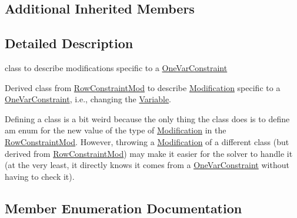 \subsection*{Additional Inherited Members}


\subsection{Detailed Description}
class to describe modifications specific to a \mbox{\hyperlink{class_s_m_spp__di__unipi__it_1_1_one_var_constraint}{One\+Var\+Constraint}} 

Derived class from \mbox{\hyperlink{class_s_m_spp__di__unipi__it_1_1_row_constraint_mod}{Row\+Constraint\+Mod}} to describe \mbox{\hyperlink{class_s_m_spp__di__unipi__it_1_1_modification}{Modification}} specific to a \mbox{\hyperlink{class_s_m_spp__di__unipi__it_1_1_one_var_constraint}{One\+Var\+Constraint}}, i.\+e., changing the \mbox{\hyperlink{class_s_m_spp__di__unipi__it_1_1_variable}{Variable}}.

Defining a class is a bit weird because the only thing the class does is to define am enum for the new value of the type of \mbox{\hyperlink{class_s_m_spp__di__unipi__it_1_1_modification}{Modification}} in the \mbox{\hyperlink{class_s_m_spp__di__unipi__it_1_1_row_constraint_mod}{Row\+Constraint\+Mod}}. However, throwing a \mbox{\hyperlink{class_s_m_spp__di__unipi__it_1_1_modification}{Modification}} of a different class (but derived from \mbox{\hyperlink{class_s_m_spp__di__unipi__it_1_1_row_constraint_mod}{Row\+Constraint\+Mod}}) may make it easier for the solver to handle it (at the very least, it directly knows it comes from a \mbox{\hyperlink{class_s_m_spp__di__unipi__it_1_1_one_var_constraint}{One\+Var\+Constraint}} without having to check it). 

\subsection{Member Enumeration Documentation}
\mbox{\label{class_s_m_spp__di__unipi__it_1_1_one_var_constraint_mod_a354f6f78be692d52cb82cf60b7d76df5}} 
